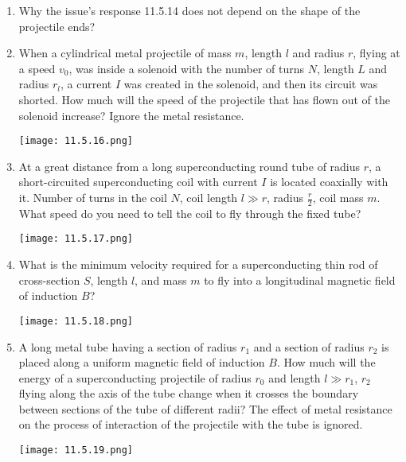\documentclass{article}
\begin{document}
\begin{enumerate}[label=11.5.\arabic*]
\item Why the issue's response 11.5.14 does not depend on the shape of the projectile ends?

\item When a cylindrical metal projectile of mass $m$, length $l$ and radius $r$, flying at a speed $v_0$, was inside a solenoid with the number of turns $N$, length $L$ and radius $r_l$, a current $I$ was created in the solenoid, and then its circuit was shorted. How much will the speed of the projectile that has flown out of the solenoid increase? Ignore the metal resistance.

\begin{center}
    \texttt{[image: 11.5.16.png]}
\end{center}


\item At a great distance from a long superconducting round tube of radius $r$, a short-circuited superconducting coil with current $I$ is located coaxially with it. Number of turns in the coil $N$, coil length $l \gg r$, radius $\frac{r}{2}$, coil mass $m$. What speed do you need to tell the coil to fly through the fixed tube?

\begin{center}
    \texttt{[image: 11.5.17.png]}
\end{center}


\item What is the minimum velocity required for a superconducting thin rod of cross-section $S$, length $l$, and mass $m$ to fly into a longitudinal magnetic field of induction $B$?

\begin{center}
    \texttt{[image: 11.5.18.png]}
\end{center}


\item A long metal tube having a section of radius $r_1$ and a section of radius $r_2$ is placed along a uniform magnetic field of induction $B$. How much will the energy of a superconducting projectile of radius $r_0$ and length $l \gg r_1$, $r_2$ flying along the axis of the tube change when it crosses the boundary between sections of the tube of different radii? The effect of metal resistance on the process of interaction of the projectile with the tube is ignored.

\begin{center}
    \texttt{[image: 11.5.19.png]}
\end{center}



\end{enumerate}
\end{document}
